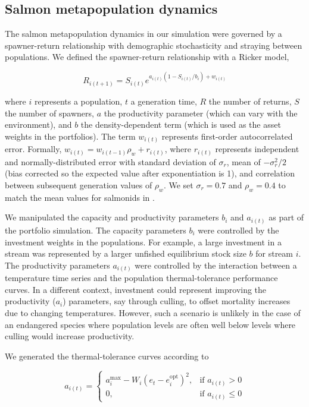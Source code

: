 \subsection{Salmon metapopulation dynamics}\label{salmon-metapopulation-dynamics}

The salmon metapopulation dynamics in our simulation were governed by a spawner-return relationship with demographic stochasticity and straying between populations. We defined the spawner-return relationship with a Ricker model,

\[R_{i(t+1)} = S_{i(t)}e^{a_{i(t)}(1-S_{i(t)}/b_i) + w_{i(t)}}\]

\noindent
where $i$ represents a population, $t$ a generation time, $R$ the number of returns, $S$ the number of spawners, $a$ the productivity parameter (which can vary with the environment), and $b$ the density-dependent term (which is used as the asset weights in the portfolios). The term $w_{i(t)}$ represents first-order autocorrelated error. Formally, $w_{i(t)} = w_{i(t-1)} \rho_w + r_{i(t)}$, where $r_{i(t)}$ represents independent and normally-distributed error with standard deviation of $\sigma_r$, mean of $-\sigma_r^2 / 2$ (bias corrected so the expected value after exponentiation is 1), and correlation between subsequent generation values of $\rho_w$. We set $\sigma_r = 0.7$ and $\rho_w = 0.4$ to match the mean values for salmonids in \citet{thorson2014a}.

We manipulated the capacity and productivity parameters $b_i$ and $a_{i(t)}$ as part of the portfolio simulation. The capacity parameters $b_i$ were controlled by the investment weights in the populations. For example, a large investment in a stream was represented by a larger unfished equilibrium stock size $b$ for stream $i$. The productivity parameters $a_{i(t)}$ were controlled by the interaction between a temperature time series and the population thermal-tolerance performance curves. In a different context, investment could represent improving the productivity ($a_i$) parameters, say through culling, to offset mortality increases due to changing temperatures. However, such a scenario is unlikely in the case of an endangered species where population levels are often well below levels where culling would increase productivity.

We generated the thermal-tolerance curves according to

\[a_{i(t)} = \begin{cases} a_i^{\mathrm{max}} -
W_i (e_t - e_i^{\mathrm{opt}})^2,
& \text{if } a_{i(t)} > 0\\ 0, & \text{if } a_{i(t)} \leq
0 \end{cases}\]

